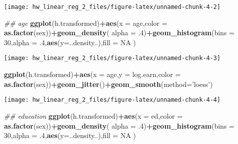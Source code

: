 \documentclass[]{article}
\newenvironment{Shaded}{\begin{snugshade}}{\end{snugshade}}
\newcommand{\CommentTok}[1]{\textcolor[rgb]{0.56,0.35,0.01}{\textit{#1}}}
\newcommand{\DataTypeTok}[1]{\textcolor[rgb]{0.13,0.29,0.53}{#1}}
\newcommand{\DecValTok}[1]{\textcolor[rgb]{0.00,0.00,0.81}{#1}}
\newcommand{\FloatTok}[1]{\textcolor[rgb]{0.00,0.00,0.81}{#1}}
\newcommand{\KeywordTok}[1]{\textcolor[rgb]{0.13,0.29,0.53}{\textbf{#1}}}
\newcommand{\NormalTok}[1]{#1}
\newcommand{\OperatorTok}[1]{\textcolor[rgb]{0.81,0.36,0.00}{\textbf{#1}}}
\newcommand{\OtherTok}[1]{\textcolor[rgb]{0.56,0.35,0.01}{#1}}
\newcommand{\StringTok}[1]{\textcolor[rgb]{0.31,0.60,0.02}{#1}}
\begin{document}
\begin{center}\texttt{[image: hw\_linear\_reg\_2\_files/figure-latex/unnamed-chunk-4-2]} \end{center}

\begin{Shaded}
\begin{Highlighting}[]
\CommentTok{## age}
\KeywordTok{ggplot}\NormalTok{(h.transformed)}\OperatorTok{+}\KeywordTok{aes}\NormalTok{(}\DataTypeTok{x =}\NormalTok{ age,}\DataTypeTok{color =} \KeywordTok{as.factor}\NormalTok{(sex))}\OperatorTok{+}\KeywordTok{geom_density}\NormalTok{( }\DataTypeTok{alpha =} \FloatTok{.4}\NormalTok{)}\OperatorTok{+}\KeywordTok{geom_histogram}\NormalTok{(}\DataTypeTok{bins =} \DecValTok{30}\NormalTok{,}\DataTypeTok{alpha =} \FloatTok{.4}\NormalTok{,}\KeywordTok{aes}\NormalTok{(}\DataTypeTok{y=}\NormalTok{..density..),}\DataTypeTok{fill =} \OtherTok{NA}\NormalTok{ )}
\end{Highlighting}
\end{Shaded}

\begin{center}\texttt{[image: hw\_linear\_reg\_2\_files/figure-latex/unnamed-chunk-4-3]} \end{center}

\begin{Shaded}
\begin{Highlighting}[]
\KeywordTok{ggplot}\NormalTok{(h.transformed)}\OperatorTok{+}\KeywordTok{aes}\NormalTok{(}\DataTypeTok{x =}\NormalTok{ age,}\DataTypeTok{y =}\NormalTok{ log.earn,}\DataTypeTok{color =} \KeywordTok{as.factor}\NormalTok{(sex))}\OperatorTok{+}\KeywordTok{geom_jitter}\NormalTok{()}\OperatorTok{+}\KeywordTok{geom_smooth}\NormalTok{(}\DataTypeTok{method=}\StringTok{'loess'}\NormalTok{)}
\end{Highlighting}
\end{Shaded}

\begin{center}\texttt{[image: hw\_linear\_reg\_2\_files/figure-latex/unnamed-chunk-4-4]} \end{center}

\begin{Shaded}
\begin{Highlighting}[]
\CommentTok{## education}
\KeywordTok{ggplot}\NormalTok{(h.transformed)}\OperatorTok{+}\KeywordTok{aes}\NormalTok{(}\DataTypeTok{x =}\NormalTok{ ed,}\DataTypeTok{color =} \KeywordTok{as.factor}\NormalTok{(sex))}\OperatorTok{+}\KeywordTok{geom_density}\NormalTok{( }\DataTypeTok{alpha =} \FloatTok{.4}\NormalTok{)}\OperatorTok{+}\KeywordTok{geom_histogram}\NormalTok{(}\DataTypeTok{bins =} \DecValTok{30}\NormalTok{,}\DataTypeTok{alpha =} \FloatTok{.4}\NormalTok{,}\KeywordTok{aes}\NormalTok{(}\DataTypeTok{y=}\NormalTok{..density..),}\DataTypeTok{fill =} \OtherTok{NA}\NormalTok{ )}
\end{Highlighting}
\end{Shaded}
\end{document}
